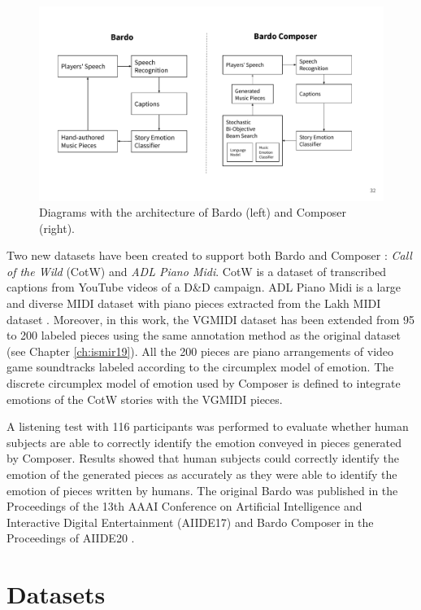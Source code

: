 \begin{figure}[h]
\centering
 \includegraphics[width=\columnwidth]{imgs/aiide20/composer.pdf}
 \caption{Diagrams with the architecture of Bardo (left) and Composer (right). }
 \label{fig:bardo}
\end{figure}

Two new datasets have been created to support both Bardo and Composer \cite{padovani2017, ferreira2020computer}: \textit{Call of the Wild} (CotW) and \textit{ADL Piano Midi}. CotW is a dataset of transcribed captions from YouTube videos of a D\&D campaign. ADL Piano Midi is a large and diverse MIDI dataset with piano pieces extracted from the Lakh MIDI dataset \cite{raffel2016learning}. Moreover, in this work, the VGMIDI dataset has been extended from 95 to 200 labeled pieces using the same annotation method as the original dataset (see Chapter \ref{ch:ismir19}). All the 200 pieces are piano arrangements of video game soundtracks labeled according to the circumplex model of emotion. The discrete circumplex model of emotion used by Composer is defined to integrate emotions of the CotW stories with the VGMIDI pieces.

A listening test with 116 participants was performed to evaluate whether human subjects are able to correctly identify the emotion conveyed in pieces generated by Composer. Results showed that human subjects could correctly identify the emotion of the generated pieces as accurately as they were able to identify the emotion of pieces written by humans. The original Bardo was published in the Proceedings of the 13th AAAI Conference on Artificial Intelligence and Interactive Digital Entertainment (AIIDE17) \cite{padovani2017} and Bardo Composer in the Proceedings of AIIDE20 \cite{ferreira2020computer}.

\section{Datasets}

